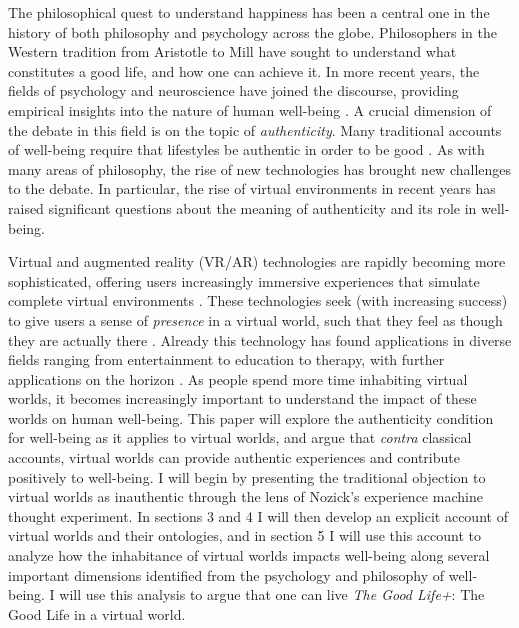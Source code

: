 The philosophical quest to understand happiness has been a central one in the 
history of both philosophy and psychology across the globe. Philosophers in
the Western tradition from Aristotle to Mill have sought to understand what
constitutes a good life, and how one can achieve it. In more recent years, the
fields of psychology and neuroscience have joined the discourse, providing
empirical insights into the nature of human well-being \citep{Stoll2014}. 
A crucial dimension of the debate in this field is on the topic of
\emph{authenticity}. Many traditional accounts of well-being require that
lifestyles be authentic in order to be good \citep{sep-authenticity}. As with 
many areas of philosophy, the rise of new technologies has brought new 
challenges to the debate. In particular, the rise of virtual environments in
recent years has raised significant questions about the meaning of authenticity
and its role in well-being.

Virtual and augmented reality (VR/AR) technologies are rapidly becoming more
sophisticated, offering users increasingly immersive experiences that simulate
complete virtual environments \citep{Wang_Siau_2024}. These technologies seek
(with increasing success) to give users a sense of \emph{presence} in a virtual
world, such that they feel as though they are actually there
\citep{slater2018immersion}. Already this technology has found applications in
diverse fields ranging from entertainment to education to therapy, with further
applications on the horizon \citep{ijerph191811278}. As people spend more time
inhabiting virtual worlds, it becomes increasingly important to understand the
impact of these worlds on human well-being. This paper will explore the
authenticity condition for well-being as it applies to virtual worlds, and argue
that \emph{contra} classical accounts, virtual worlds can provide authentic
experiences and contribute positively to well-being. I will begin by presenting
the traditional objection to virtual worlds as inauthentic through the lens of
Nozick's experience machine thought experiment. In sections 3 and 4 I will then
develop an explicit account of virtual worlds and their ontologies, and in
section 5 I will use this account to analyze how the inhabitance of virtual
worlds impacts well-being along several important dimensions identified from the
psychology and philosophy of well-being. I will use this analysis to argue that
one can live \emph{The Good Life+}: The Good Life in a virtual world.